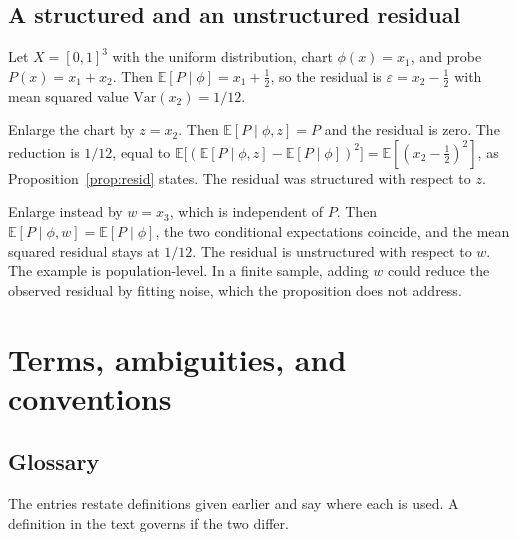 \documentclass[11pt]{article}
\theoremstyle{remark}
\newcommand{\E}{\mathbb{E}}
\begin{document}
\subsection{A structured and an unstructured residual}

Let $X=[0,1]^3$ with the uniform distribution, chart $\phi(x)=x_1$, and probe $P(x)=x_1+x_2$. Then $\E[P\mid\phi]=x_1+\tfrac12$, so the residual is $\varepsilon=x_2-\tfrac12$ with mean squared value $\mathrm{Var}(x_2)=1/12$.

Enlarge the chart by $z=x_2$. Then $\E[P\mid\phi,z]=P$ and the residual is zero. The reduction is $1/12$, equal to $\E\bigl[(\E[P\mid\phi,z]-\E[P\mid\phi])^2\bigr]=\E[(x_2-\tfrac12)^2]$, as Proposition~\ref{prop:resid} states. The residual was structured with respect to $z$.

Enlarge instead by $w=x_3$, which is independent of $P$. Then $\E[P\mid\phi,w]=\E[P\mid\phi]$, the two conditional expectations coincide, and the mean squared residual stays at $1/12$. The residual is unstructured with respect to $w$. The example is population-level. In a finite sample, adding $w$ could reduce the observed residual by fitting noise, which the proposition does not address.

\section{Terms, ambiguities, and conventions}\label{sec:terms}

\subsection{Glossary}

The entries restate definitions given earlier and say where each is used. A definition in the text governs if the two differ.
\end{document}
